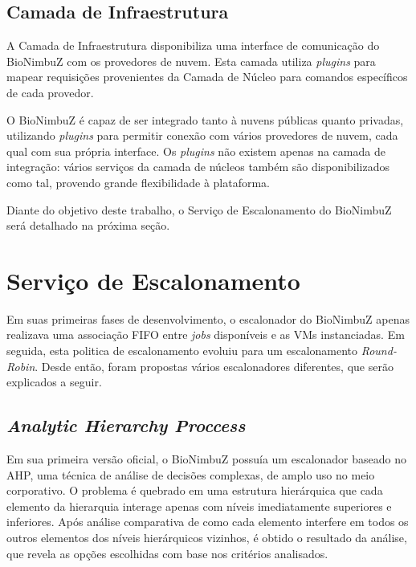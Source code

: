 \begin{itemize}
	\end{itemize}
	
	\subsection{Camada de Infraestrutura} A Camada de Infraestrutura disponibiliza uma interface de comunicação do BioNimbuZ com os provedores de nuvem. Esta camada utiliza \textit{plugins} para mapear requisições provenientes da Camada de Núcleo para comandos específicos de cada provedor.

O BioNimbuZ é capaz de ser integrado tanto à nuvens públicas quanto privadas, utilizando \textit{plugins} para permitir conexão com vários provedores de nuvem, cada qual com sua própria interface. Os \textit{plugins} não existem apenas na camada de integração: vários serviços da camada de núcleos também são disponibilizados como tal, provendo grande flexibilidade à plataforma.

Diante do objetivo deste trabalho, o Serviço de Escalonamento do BioNimbuZ será detalhado na próxima seção.

\section{Serviço de Escalonamento}

Em suas primeiras fases de desenvolvimento, o escalonador do BioNimbuZ apenas realizava uma associação \acrfull{FIFO} entre \textit{jobs} disponíveis e as \acrshort{VM}s instanciadas. Em seguida, esta politica de escalonamento evoluiu para um escalonamento \textit{Round-Robin}. Desde então, foram propostas vários escalonadores diferentes, que serão explicados a seguir.

\subsection{\textit{Analytic Hierarchy Proccess}}
Em sua primeira versão oficial, o BioNimbuZ possuía um escalonador baseado no \acrfull{AHP}\cite{6732620_BioNimbuZ_ACOsched}, uma técnica de análise de decisões complexas, de amplo uso no meio corporativo. O problema é quebrado em uma estrutura hierárquica que cada elemento da hierarquia interage apenas com níveis imediatamente superiores e inferiores. Após análise comparativa de como cada elemento interfere em todos os outros elementos dos níveis hierárquicos vizinhos, é obtido o resultado da análise, que revela as opções escolhidas com base nos critérios analisados.

